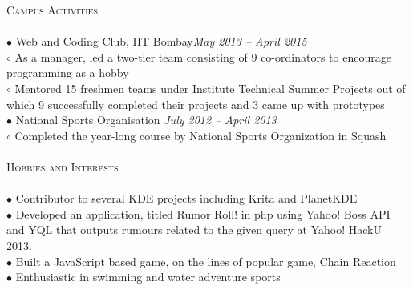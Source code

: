 \documentclass[a4paper,9pt]{article}
\begin{document}
\textcolor{myrust}{\large{\textsc{Campus Activities}}}\textcolor{mygray}{\sout{\hfill}}\\\\
\small %
$\bullet$ Web and Coding Club, IIT Bombay\hfill\textit{May 2013 -- April 2015}\\
\hspace*{0.35cm}$\circ$ As a manager, led a two-tier team consisting of 9 co-ordinators to encourage programming as a hobby\\
\hspace*{0.35cm}$\circ$ Mentored 15 freshmen teams under Institute Technical Summer Projects out of which 9 successfully completed their projects and 3 came up with prototypes\\
$\bullet$ National Sports Organisation \hfill\textit{July 2012 -- April 2013}\\
\hspace*{0.35cm}$\circ$ Completed the year-long course by National Sports Organization in Squash\\\\


\textcolor{myrust}{\large{\textsc{Hobbies and Interests}}}\textcolor{mygray}{\sout{\hfill}}\\\\
\small %
$\bullet$ Contributor to several KDE projects including Krita and PlanetKDE\\
$\bullet$ Developed an application, titled \href{https://github.com/ranveeraggarwal/Rumor-Roll}{Rumor Roll!} in php using Yahoo! Boss API and YQL that outputs rumours related to the given query at Yahoo! HackU 2013.\\
$\bullet$ Built a JavaScript based game, on the lines of popular game, Chain Reaction\\
$\bullet$ Enthusiastic in swimming and water adventure sports\\
\end{document}
